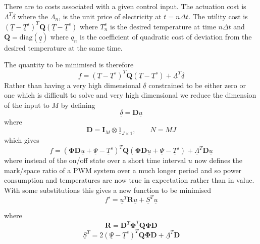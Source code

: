 \documentclass[11pt]{article}
\begin{document}
\section{}
There are to costs associated with a given control input. The actuation cost is $\underline{\Lambda}^{T} \underline{\delta}$ where the $\Lambda_{n}$, is the unit price of electricity at $t=n \Delta t$. The utility cost is $(\underline{T}-\underline{T}^s)^{T}\mathbf{Q}(\underline{T}-\underline{T}^s)$ where ${T}^{s}_{n}$ is the desired temperature at time $n \Delta t$ and $\mathbf{Q}=\mathrm{diag}(\underline{q})$ where $q_{n}$ is the coefficient of quadratic cost of deviation from the desired temperature at the same time.

The quantity to be minimised is therefore
\begin{equation}
f = (\underline{T}-\underline{T}^s)^{T}\mathbf{Q}(\underline{T}-\underline{T}^s)+\underline{\Lambda}^{T} \underline{\delta}
\end{equation}
Rather than having a very high dimensional $\underline{\delta}$ constrained to be either zero or one which is difficult to solve and very high dimensional we reduce the dimension of the input to $M$ by defining
\begin{equation}
\underline{\delta}=\mathbf{D}\underline{u}
\end{equation}
where
\begin{equation}
\mathbf{D}=\mathbf{I}_{M} \otimes \underline{1}_{J \times 1},\qquad N=MJ
\end{equation}
which gives
\begin{equation}
f = (\mathbf{\Phi} \mathbf{D}\underline{u}+\underline{\Psi}-\underline{T}^s)^{T}\mathbf{Q}(\mathbf{\Phi} \mathbf{D}\underline{u}+\underline{\Psi}-\underline{T}^s)+\underline{\Lambda}^{T} \mathbf{D}\underline{u}
\end{equation}
where instead of the on/off state over a short time interval $u$ now defines the mark/space ratio of a PWM system over a much longer period and so power consumption and temperatures are now true in expectation rather than in value. With some substitutions this gives a new function to be minimised
\begin{equation}
f'=\underline{u}^{T}\mathbf{R}\underline{u}+\underline{S}^{T}\underline{u}
\end{equation}

where
\begin{equation}
\mathbf{R}=\mathbf{D}^{T}\mathbf{\Phi}^{T}\mathbf{Q}\mathbf{\Phi}\mathbf{D}
\end{equation}
\begin{equation}
\underline{S}^{T}=2(\underline{\Psi}-\underline{T}^s)^{T}\mathbf{Q}\mathbf{\Phi}\mathbf{D}+\underline{\Lambda}^{T} \mathbf{D}
\end{equation}
\end{document}

